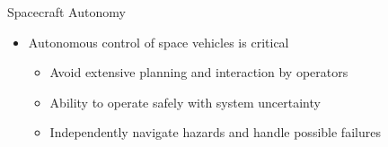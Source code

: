 \begin{frame}[t]{Spacecraft Autonomy} %
\begin{itemize}
    \item Autonomous control of space vehicles is critical
    \begin{itemize}
        \item Avoid extensive planning and interaction by operators
        \item Ability to operate safely with system uncertainty 
        \item Independently navigate hazards and handle possible failures
    \end{itemize}
\end{itemize}
\end{frame}   %


